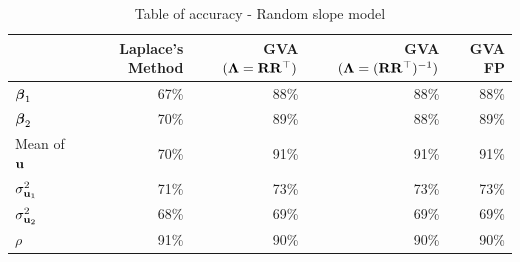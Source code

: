 			\begin{table}
				\caption{Table of accuracy - Random slope model}
				\label{tab:accuracy_slope}
				\begin{tabular}{|l|rrrr|}
					\hline
					                   & Laplace's Method & GVA $({\boldsymbol \Lambda} = {\bf R} {\bf R}^\top)$ & GVA $({\boldsymbol \Lambda} = ({\bf R} {\bf R}^\top)^{-1})$ & GVA FP \\
					\hline
					${\boldsymbol \beta}_1$         & 67\%             & 88\%                            & 88\%                                   & 88\%   \\
					${\boldsymbol \beta}_2$         & 70\%             & 89\%                            & 88\%                                   & 89\%   \\
					Mean of ${\bf u}$      & 70\%             & 91\%                            & 91\%                                   & 91\%   \\
					$\sigma^2_{{\bf u}_1}$ & 71\%             & 73\%                            & 73\%                                   & 73\%   \\
					$\sigma^2_{{\bf u}_2}$ & 68\%             & 69\%                            & 69\%                                   & 69\%   \\
					$\rho$             & 91\%             & 90\%                            & 90\%                                   & 90\%   \\
					\hline
				\end{tabular}
			\end{table}
					
					
